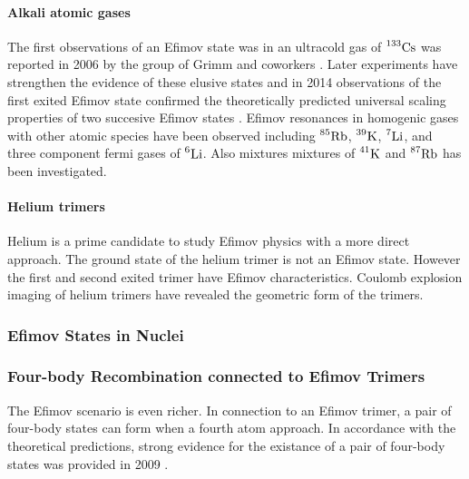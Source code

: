 \documentclass{article}
\begin{document}
\paragraph{Alkali atomic gases} 
The first observations of an Efimov state was in an ultracold gas of $\prescript{133}{}{\mathrm{Cs}}$ was reported in 2006 by the group of Grimm and coworkers \cite{Grimm:2006}. Later experiments have strengthen the evidence of these elusive states and in 2014 observations of the first exited Efimov state confirmed the theoretically predicted universal scaling properties of two succesive Efimov states \cite{Huang2014}. Efimov resonances in homogenic gases with other atomic species have been observed including $\prescript{85}{}{\mathrm{Rb}}$, $\prescript{39}{}{\mathrm{K}}$, $\prescript{7}{}{\mathrm{Li}}$, and three component fermi gases of $\prescript{6}{}{\mathrm{Li}}$. Also mixtures mixtures of $\prescript{41}{}{\mathrm{K}}$ and $\prescript{87}{}{\mathrm{Rb}}$ has been investigated.

\paragraph{Helium trimers}
Helium is a prime candidate to study Efimov physics with a more direct approach. The ground state of the helium trimer is not an Efimov state. However the first and second exited trimer have Efimov characteristics. Coulomb explosion imaging of helium trimers have revealed the geometric form of the trimers. \cite{Kunitski:2015qth}

\subsubsection{Efimov States in Nuclei }

\subsubsection{Four-body Recombination connected to Efimov Trimers} 
The Efimov scenario is even richer. In connection to an Efimov trimer, a pair of four-body states can form when a fourth atom approach. In accordance with the theoretical predictions, strong evidence for the existance of a pair of four-body states was provided in 2009 \cite{Grimm:2009}. 
\end{document}
